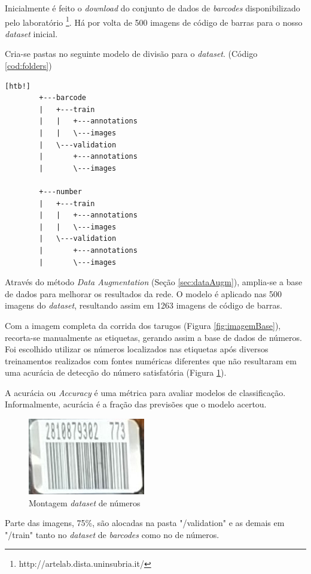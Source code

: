 Inicialmente é feito o \textit{download} do conjunto de dados de \textit{barcodes} disponibilizado pelo laboratório \citeauthor{Arte-Lab}\footnote{http://artelab.dista.uninsubria.it/}. Há por volta de 500 imagens de código de barras para o nosso \textit{dataset} inicial.


Cria-se pastas no seguinte modelo de divisão para o \textit{dataset}. (Código \ref{cod:folders})
\begin{lstlisting}[caption=Divisão dos arquivos para dataset, label=cod:folders][htb!]
        +---barcode
        |   +---train
        |   |   +---annotations
        |   |   \---images
        |   \---validation
        |       +---annotations
        |       \---images
        
        +---number
        |   +---train
        |   |   +---annotations
        |   |   \---images
        |   \---validation
        |       +---annotations
        |       \---images
\end{lstlisting}

Através do método \textit{Data Augmentation} (Seção \ref{sec:dataAugm}), amplia-se a base de dados para melhorar os resultados da rede. O modelo é aplicado nas 500 imagens do \textit{dataset}, resultando assim em 1263 imagens de código de barras.


Com a imagem completa da corrida dos tarugos (Figura \ref{fig:imagemBase}), recorta-se manualmente as etiquetas, gerando assim a base de dados de números. Foi escolhido utilizar os números localizados nas etiquetas após diversos treinamentos realizados com fontes numéricas diferentes que não resultaram em uma acurácia de detecção do número satisfatória (Figura \ref{fig:barcodeDataset}).

A acurácia ou \textit{Accuracy} é uma métrica para avaliar modelos de classificação. Informalmente, acurácia é a fração das previsões que o modelo acertou.

\begin{figure}[htbp]
	\centering
	\includegraphics[width=0.25\linewidth]{figuras/MachineLearning/barcodeDataset.png}
	\caption{Montagem \textit{dataset} de números}
	\label{fig:barcodeDataset}
\end{figure}

Parte das imagens, 75\%, são alocadas na pasta "/validation" e as demais em "/train"  tanto no \textit{dataset} de \textit{barcodes} como no de números.

